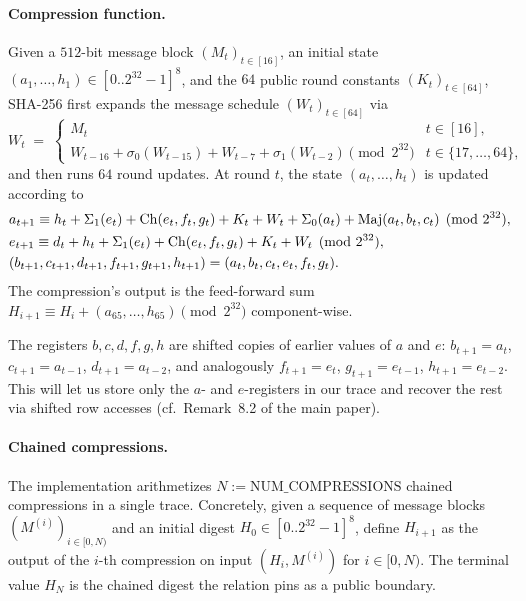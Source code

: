 \paragraph{Compression function.}
Given a $512$-bit message block $(M_t)_{t \in [16]}$, an initial state
$(a_1,\dots,h_1) \in [0\mathbin{..}2^{32}-1]^8$, and the
$64$ public round constants $(K_t)_{t\in[64]}$, SHA-256 first expands
the message schedule $(W_t)_{t\in[64]}$ via
\begin{equation}\label{eq:msched}
W_t \;=\; \begin{cases} M_t & t \in [16], \\
W_{t-16} + \sigma_0(W_{t-15}) + W_{t-7} + \sigma_1(W_{t-2}) \pmod{2^{32}} & t \in \{17,\dots,64\},
\end{cases}
\end{equation}
and then runs $64$ round updates. At round $t$, the state
$(a_t,\dots,h_t)$ is updated according to
\begin{align}
&a_{t+1} \equiv h_t + \Sigma_1(e_t) + \operatorname{Ch}(e_t,f_t,g_t) + K_t + W_t + \Sigma_0(a_t) + \operatorname{Maj}(a_t,b_t,c_t) \pmod{2^{32}}, \label{eq:a-update}\\
&e_{t+1} \equiv d_t + h_t + \Sigma_1(e_t) + \operatorname{Ch}(e_t,f_t,g_t) + K_t + W_t
                \pmod{2^{32}}, \label{eq:e-update}\\
&(b_{t+1},c_{t+1},d_{t+1},f_{t+1},g_{t+1},h_{t+1}) = (a_t,b_t,c_t,e_t,f_t,g_t).\notag
\end{align}
The compression's output is the feed-forward sum
$H_{i+1} \equiv H_i + (a_{65},\dots,h_{65}) \pmod{2^{32}}$ component-wise.

\begin{remark}\label{rem:shift-register}
The registers $b,c,d,f,g,h$ are shifted copies of earlier values
of $a$ and $e$: $b_{t+1}=a_t$, $c_{t+1}=a_{t-1}$, $d_{t+1}=a_{t-2}$,
and analogously $f_{t+1}=e_t$, $g_{t+1}=e_{t-1}$, $h_{t+1}=e_{t-2}$.
This will let us store only the $a$- and $e$-registers in our trace
and recover the rest via shifted row accesses
(cf.\ Remark~8.2 of the main paper).
\end{remark}

\paragraph{Chained compressions.}
The implementation arithmetizes $N := \mathrm{NUM\_COMPRESSIONS}$
chained compressions in a single trace. Concretely, given a sequence of
message blocks $(M^{(i)})_{i \in [0,N)}$ and an initial digest
$H_0 \in [0\mathbin{..}2^{32}-1]^8$, define
$H_{i+1}$ as the output of the $i$-th compression on input
$(H_i, M^{(i)})$ for $i \in [0,N)$. The terminal value $H_N$ is the
chained digest the relation pins as a public boundary.

